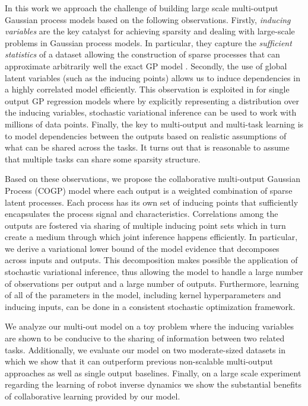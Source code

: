 In this work we approach the challenge of building large scale multi-output Gaussian process models  
based on the following observations.
Firstly, \emph{inducing variables} are the key catalyst
for achieving sparsity and dealing with large-scale problems in Gaussian process models.
In particular, they capture the \emph{sufficient statistics} of a dataset allowing the construction of sparse 
processes that can approximate arbitrarily well the exact GP model \citep{titsias2009variational}.
Secondly, the use of global latent variables (such as the inducing points) allows us to 
induce dependencies in a highly correlated model efficiently. 
This observation is exploited in \cite{hensmangaussian} for single output GP regression models 
where by explicitly representing a distribution over the inducing variables, stochastic variational inference 
can be used to work with millions of data points.
Finally, the key to multi-output and multi-task learning is to model dependencies between the outputs  
based on realistic assumptions of what can be shared across the tasks. It turns out that is 
reasonable to assume that multiple tasks can share some sparsity structure. 


Based on these observations, we propose the collaborative multi-output Gaussian Process (COGP) model 
where each output is a weighted combination of sparse latent processes.
 Each process has its own set of inducing points that sufficiently encapsulates the process signal and characteristics.
Correlations among the outputs are fostered via sharing of multiple inducing point sets 
which in turn create a medium through which joint inference happens efficiently.
In particular, we derive a variational lower bound of the model evidence that decomposes across 
inputs and outputs. 
This decomposition makes possible the application of stochastic variational inference, 
thus allowing the model to handle a large number of observations per output and a large number of outputs.
Furthermore, learning of all of the  parameters in the model, including
kernel hyperparameters and inducing inputs, can be done in a consistent stochastic optimization framework.

We analyze our multi-out model on a toy problem  where the inducing variables are shown to be 
conducive to the sharing of information between two related tasks. 
Additionally, we  evaluate  our model on two moderate-sized datasets in which we show that it
can outperform previous non-scalable multi-output approaches as well as single output baselines.
Finally, on a  large scale experiment regarding the learning of robot inverse dynamics we show 
the substantial benefits of collaborative learning provided by our model.
  
